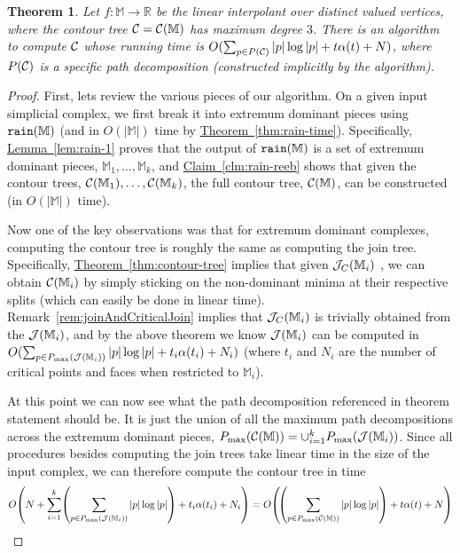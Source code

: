\documentclass[11pt]{article}
\newtheorem{theorem}{Theorem}[section]
\theoremstyle{definition}
\newcommand{\cC}{{\cal C}}
\newcommand{\cJ}{{\cal J}}
\newcommand{\MM}{\mathbb{M}}
\newcommand{\RR}{\mathbb{R}}
\newcommand{\Clm}[1]{\hyperref[clm:#1]{Claim~\ref*{clm:#1}}} %
\newcommand{\Thm}[1]{\hyperref[thm:#1]{Theorem~\ref*{thm:#1}}} %
\newcommand{\Lem}[1]{\hyperref[lem:#1]{Lemma~\ref*{lem:#1}}} %
\newcommand{\jc}{\cJ_C}
\newcommand{\pmax}{P_{\max}}
\newcommand{\rain}{{\tt rain}}
\newcommand{\pth}[2][\!]{#1\left({#2}\right)}
\begin{document}
\begin{theorem}
Let $f:\MM \to \RR$ be the linear interpolant over distinct valued vertices, where the contour tree $\cC=\cC(\MM)$ has maximum degree $3$. 
There is an algorithm to compute $\cC$ whose running time is $O(\sum_{p \in P(\cC)} |p|\log |p| + t\alpha(t) + N)$,
where $P(\cC)$ is a specific path decomposition (constructed implicitly by the algorithm).
\end{theorem}
\begin{proof}
First, lets review the various pieces of our algorithm. 
On a given input simplicial complex, we first break it into extremum dominant pieces using $\rain(\MM)$ (and in $O(|\MM|)$ time by \Thm{rain-time}).  
Specifically, \Lem{rain-1} proves that the output of $\rain(\MM)$ is a set of extremum dominant pieces, 
$\MM_1, \dots, \MM_k$, and \Clm{rain-reeb} shows that given the contour trees, $\cC(\MM_1), \dots, \cC(\MM_k)$, 
the full contour tree, $\cC(\MM)$, can be constructed (in $O(|\MM|)$ time).

Now one of the key observations was that for extremum dominant complexes, computing the contour tree is roughly the same as 
computing the join tree.  Specifically, \Thm{contour-tree} implies that given $\jc(\MM_i)$ , 
we can obtain $\cC(\MM_i)$ by simply sticking on the non-dominant minima at their respective splits (which can easily be done in linear time).
Remark~\ref{rem:joinAndCriticalJoin} implies that $\jc(\MM_i)$ is trivially obtained from the $\cJ(\MM_i)$, and 
 by the above theorem we know $\cJ(\MM_i)$ can be computed in $O(\sum_{p \in \pmax(\cJ(\MM_i))} |p|\log |p| + t_i\alpha(t_i) + N_i)$
(where $t_i$ and $N_i$ are the number of critical points and faces when restricted to $\MM_i$).

At this point we can now see what the path decomposition referenced in theorem statement should be.  It is just the union of all the maximum 
path decompositions across the extremum dominant pieces, $\pmax(\cC(\MM)) = \cup_{i=1}^k \pmax(\cJ(\MM_i))$.
Since all procedures besides computing the join trees take linear time in the size of the input complex, we can therefore 
compute the contour tree in time
\[
O\pth{N+ \sum_{i=1}^k \pth{\sum_{p \in \pmax(\cJ(\MM_i))} |p|\log |p|} + t_i\alpha(t_i) + N_i}
=\break O\pth{\pth{\sum_{p \in \pmax(\cC(\MM))} |p|\log |p|} + t\alpha(t) + N}
\]




\end{proof}
\end{document}
